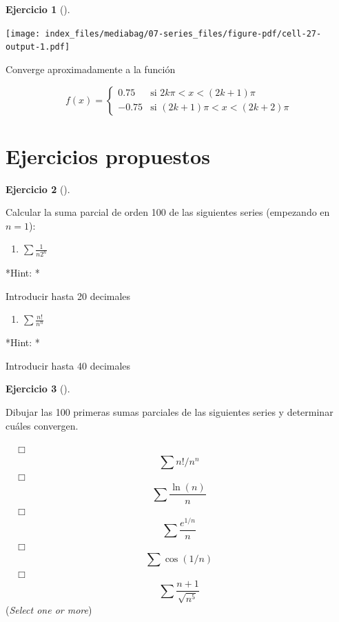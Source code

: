 \documentclass[
  a4paper,
]{scrreport}
\providecommand{\tightlist}{%
  \setlength{\itemsep}{0pt}\setlength{\parskip}{0pt}}\usepackage{longtable,booktabs,array}
\theoremstyle{definition}
\newtheorem{exercise}{Ejercicio}[chapter]
\theoremstyle{remark}
\begin{document}
\begin{exercise}[]
\begin{tcolorbox}
\texttt{[image: index\_files/mediabag/07-series\_files/figure-pdf/cell-27-output-1.pdf]}

Converge aproximadamente a la función

\[
f(x)=\begin{cases}
0.75 & \mbox{si $2k\pi<x<(2k+1)\pi$}\\
-0.75 & \mbox{si $(2k+1)\pi<x<(2k+2)\pi$}
\end{cases}
\]

\end{tcolorbox}

\end{exercise}

\section{Ejercicios propuestos}\label{ejercicios-propuestos-5}

\begin{exercise}[]\protect\hypertarget{exr-series-propuesto-1}{}\label{exr-series-propuesto-1}

Calcular la suma parcial de orden 100 de las siguientes series
(empezando en \(n=1\)):

\begin{enumerate}
\def\labelenumi{\alph{enumi}.}
\tightlist
\item
  \(\sum \frac{1}{n2^n}\)
\end{enumerate}

\vspace{18pt}*Hint: *

Introducir hasta 20 decimales

\begin{enumerate}
\def\labelenumi{\alph{enumi}.}
\setcounter{enumi}{1}
\tightlist
\item
  \(\sum \frac{n!}{n^n}\)
\end{enumerate}

\vspace{18pt}*Hint: *

Introducir hasta 40 decimales

\end{exercise}

\begin{exercise}[]\protect\hypertarget{exr-series-propuesto-2}{}\label{exr-series-propuesto-2}

Dibujar las 100 primeras sumas parciales de las siguientes series y
determinar cuáles convergen.

${\quad\Box}$ $$\sum n!/n^n$$
${\quad\Box}$ $$\sum \frac{\ln(n)}{n}$$
${\quad\Box}$ $$\sum \frac{e^{1/n}}{n}$$
${\quad\Box}$ $$\sum  \cos(1/n)$$
${\quad\Box}$ $$\sum \frac{n+1}{\sqrt{n^5}}$$
(\emph{Select one or more})

\end{exercise}
\end{document}
